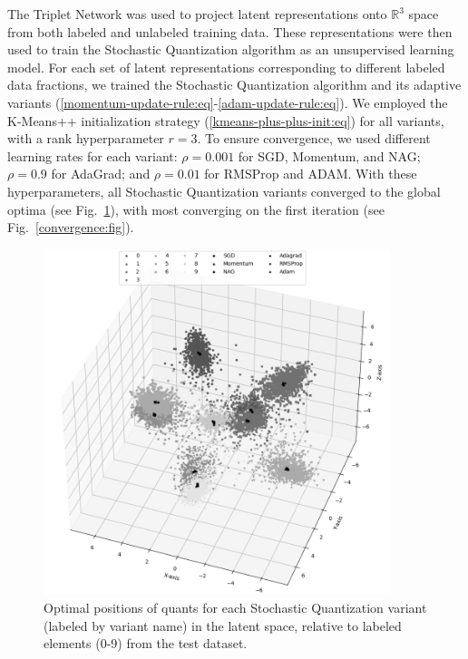 The Triplet Network was used to project latent representations onto $\mathbb{R}^3$ space from both labeled and unlabeled training data. These representations were then used to train the Stochastic Quantization algorithm as an unsupervised learning model. For each set of latent representations corresponding to different labeled data fractions, we trained the Stochastic Quantization algorithm and its adaptive variants (\ref{momentum-update-rule:eq}-\ref{adam-update-rule:eq}). We employed the K-Means++ initialization strategy (\ref{kmeans-plus-plus-init:eq}) for all variants, with a rank hyperparameter $r = 3$. To ensure convergence, we used different learning rates for each variant: $\rho = 0.001$ for SGD, Momentum, and NAG; $\rho = 0.9$ for AdaGrad; and $\rho = 0.01$ for RMSProp and ADAM. With these hyperparameters, all Stochastic Quantization variants converged to the global optima (see Fig.~\ref{quants:fig}), with most converging on the first iteration (see Fig.~\ref{convergence:fig}).

\begin{figure}
    \centering
    \includegraphics[width=0.9\textwidth]{figures/sq_quants.png}
    \caption{Optimal positions of quants for each Stochastic Quantization variant (labeled by variant name) in the latent space, relative to labeled elements (0-9) from the test dataset.}
    \label{quants:fig}
\end{figure}

